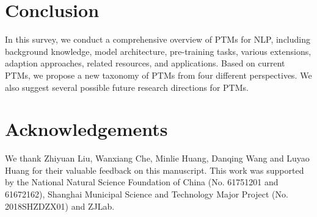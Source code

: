 \documentclass[fleqn]{SCYE-arxiv}
\begin{document}
\begin{multicols}{2}

\section{Conclusion}
\label{sec:conclusion}

In this survey, we conduct a comprehensive overview of PTMs for NLP, including background knowledge, model architecture, pre-training tasks, various extensions, adaption approaches, related resources, and applications. Based on current PTMs, we propose a new taxonomy of PTMs from four different perspectives. We also suggest several possible future research directions for PTMs.


\section*{Acknowledgements}
We thank Zhiyuan Liu, Wanxiang Che, Minlie Huang, Danqing Wang and Luyao Huang for their valuable feedback on this manuscript.
This work was supported by the National Natural Science Foundation of China (No. 61751201 and 61672162), Shanghai Municipal Science and Technology Major Project (No. 2018SHZDZX01) and ZJLab.

%


\small
\setlength{\bibsep}{0.1cm}



%

\end{multicols}
\end{document}
